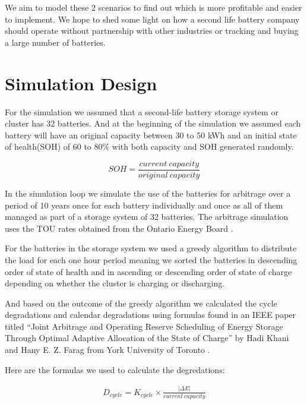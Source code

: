 \documentclass[conference]{IEEEtran}
\begin{document}
We aim to model these 2 scenarios to find out which is more profitable and easier to
implement. We hope to shed some light on how a second life battery company should operate
without partnership with other industries or tracking and buying a large number of batteries.

\section{Simulation Design}

For the simulation we assumed that a second-life battery storage system or cluster has 32 batteries. And at the beginning of the simulation we assumed each battery will have an original capacity between 30 to 50 kWh and an initial state of health(SOH) of 60 to 80\% with both capacity and SOH generated randomly.

\begin{equation}
	SOH = \frac{current \ capacity}{original \ capacity}
\end{equation}

In the simulation loop we simulate the use of the batteries for arbitrage over a period of 10 years once for each battery individually and once as all of them managed as part of a storage system of 32 batteries. The arbitrage simulation uses the TOU rates obtained from the Ontario Energy Board \cite{b11}.

For the batteries in the storage system we used a greedy algorithm to distribute the load for each one hour period meaning we sorted the batteries in descending order of state of health and in ascending or descending order of state of charge depending on whether the cluster is charging or discharging.

And based on the outcome of the greedy algorithm we calculated the cycle degradations and calendar degradations using formulas found in an IEEE paper titled “Joint Arbitrage and Operating Reserve Scheduling of Energy Storage Through Optimal Adaptive Allocation of the State of Charge” by Hadi Khani and Hany E. Z. Farag from York University of Toronto \cite{b10}.

Here are the formulas we used to calculate the degredations:

\begin{equation}
\begin{aligned}
	D_{cycle} = K_{cycle} \times \frac{| \Delta E |}{current \ capacity}
\end{aligned}
\end{equation}
\end{document}
